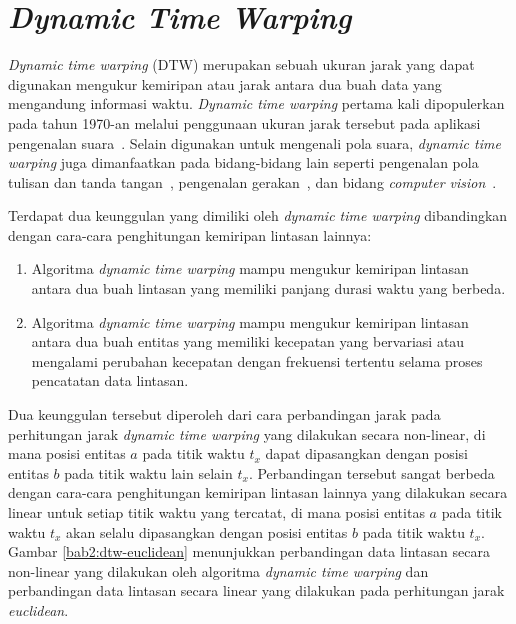 \section{\textit{Dynamic Time Warping}}
\label{sec:dtw}

\textit{Dynamic time warping} (DTW) merupakan sebuah ukuran jarak yang dapat digunakan mengukur kemiripan atau jarak antara dua buah data yang mengandung informasi waktu. \textit{Dynamic time warping} pertama kali dipopulerkan pada tahun 1970-an melalui penggunaan ukuran jarak tersebut pada aplikasi pengenalan suara~\cite{myers:02:speech-recognition}. Selain digunakan untuk mengenali pola suara, \textit{dynamic time warping} juga dimanfaatkan pada bidang-bidang lain seperti pengenalan pola tulisan dan tanda tangan~\cite{efrat:02:handwriting}, pengenalan gerakan~\cite{corradini:02:gesture}, dan bidang \textit{computer vision}~\cite{muller:02:computer-vision}. 

Terdapat dua keunggulan yang dimiliki oleh \textit{dynamic time warping} dibandingkan dengan cara-cara penghitungan kemiripan lintasan lainnya:

\begin{enumerate}
    \item Algoritma \textit{dynamic time warping} mampu mengukur kemiripan lintasan antara dua buah lintasan yang memiliki panjang durasi waktu yang berbeda.
    \item Algoritma \textit{dynamic time warping} mampu mengukur kemiripan lintasan antara dua buah entitas yang memiliki kecepatan yang bervariasi atau mengalami perubahan kecepatan dengan frekuensi tertentu selama proses pencatatan data lintasan.
\end{enumerate}

Dua keunggulan tersebut diperoleh dari cara perbandingan jarak pada perhitungan jarak \textit{dynamic time warping} yang dilakukan secara non-linear, di mana posisi entitas $a$ pada titik waktu $t_x$ dapat dipasangkan dengan posisi entitas $b$ pada titik waktu lain selain $t_x$. Perbandingan tersebut sangat berbeda dengan cara-cara penghitungan kemiripan lintasan lainnya yang dilakukan secara linear untuk setiap titik waktu yang tercatat, di mana posisi entitas $a$ pada titik waktu $t_x$ akan selalu dipasangkan dengan posisi entitas $b$ pada titik waktu $t_x$. Gambar \ref{bab2:dtw-euclidean} menunjukkan perbandingan data lintasan secara non-linear yang dilakukan oleh algoritma \textit{dynamic time warping} dan perbandingan data lintasan secara linear yang dilakukan pada perhitungan jarak \textit{euclidean}.

